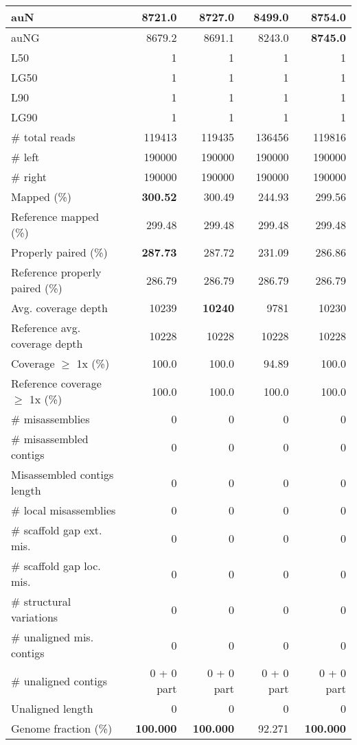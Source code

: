 \documentclass[12pt,a4paper]{article}
\begin{document}
\begin{table}[ht]
\begin{center}
\begin{tabular}{|l*{4}{|r}|}
auN & 8721.0 & 8727.0 & 8499.0 & {\bf 8754.0} \\ \hline
auNG & 8679.2 & 8691.1 & 8243.0 & {\bf 8745.0} \\ \hline
L50 & 1 & 1 & 1 & 1 \\ \hline
LG50 & 1 & 1 & 1 & 1 \\ \hline
L90 & 1 & 1 & 1 & 1 \\ \hline
LG90 & 1 & 1 & 1 & 1 \\ \hline
\# total reads & 119413 & 119435 & 136456 & 119816 \\ \hline
\# left & 190000 & 190000 & 190000 & 190000 \\ \hline
\# right & 190000 & 190000 & 190000 & 190000 \\ \hline
Mapped (\%) & {\bf 300.52} & 300.49 & 244.93 & 299.56 \\ \hline
Reference mapped (\%) & 299.48 & 299.48 & 299.48 & 299.48 \\ \hline
Properly paired (\%) & {\bf 287.73} & 287.72 & 231.09 & 286.86 \\ \hline
Reference properly paired (\%) & 286.79 & 286.79 & 286.79 & 286.79 \\ \hline
Avg. coverage depth & 10239 & {\bf 10240} & 9781 & 10230 \\ \hline
Reference avg. coverage depth & 10228 & 10228 & 10228 & 10228 \\ \hline
Coverage $\geq$ 1x (\%) & 100.0 & 100.0 & 94.89 & 100.0 \\ \hline
Reference coverage $\geq$ 1x (\%) & 100.0 & 100.0 & 100.0 & 100.0 \\ \hline
\# misassemblies & 0 & 0 & 0 & 0 \\ \hline
\# misassembled contigs & 0 & 0 & 0 & 0 \\ \hline
Misassembled contigs length & 0 & 0 & 0 & 0 \\ \hline
\# local misassemblies & 0 & 0 & 0 & 0 \\ \hline
\# scaffold gap ext. mis. & 0 & 0 & 0 & 0 \\ \hline
\# scaffold gap loc. mis. & 0 & 0 & 0 & 0 \\ \hline
\# structural variations & 0 & 0 & 0 & 0 \\ \hline
\# unaligned mis. contigs & 0 & 0 & 0 & 0 \\ \hline
\# unaligned contigs & 0 + 0 part & 0 + 0 part & 0 + 0 part & 0 + 0 part \\ \hline
Unaligned length & 0 & 0 & 0 & 0 \\ \hline
Genome fraction (\%) & {\bf 100.000} & {\bf 100.000} & 92.271 & {\bf 100.000} \\ \hline

\end{tabular}
\end{center}
\end{table}
\end{document}
